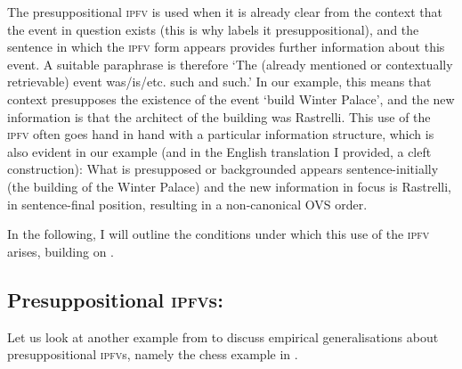 \documentclass[output=paper]{langscibook}
\begin{document}
The presuppositional \textsc{ipfv} is used when it is already clear from the context that the event in question exists (this is why \citeauthor{gronndiss} labels it presuppositional), and the sentence in which the \textsc{ipfv} form appears provides further information about this event. A suitable paraphrase is therefore `The (already mentioned or contextually retrievable) event was/is/etc. such and such.' In our example, this means that context presupposes the existence of the event `build Winter Palace', and the new information is that the architect of the building was Rastrelli. This use of the \textsc{ipfv} often goes hand in hand with a particular information structure, which is also evident in our example (and in the English translation I provided, a cleft construction): What is presupposed or backgrounded appears sentence-initially (the building of the Winter Palace) and the new information in focus is Rastrelli, in sentence-final position, resulting in a non-canonical OVS order. 

In the following, I will outline the conditions under which this use of the \textsc{ipfv} arises, building on \citet{gronndiss} \citep[who, in turn, heavily builds on empirical generalisations in the Russian literature, e.g.][]{glovinskaja82, paduceva96}.  

\subsection{Presuppositional \textsc{ipfv}s: \citet{gronndiss}}

Let us look at another example from \citet{gronndiss} to discuss empirical generalisations about presuppositional \textsc{ipfv}s, namely the chess example in .

\label{gehr:ex:chess}
\z 
\end{document}
